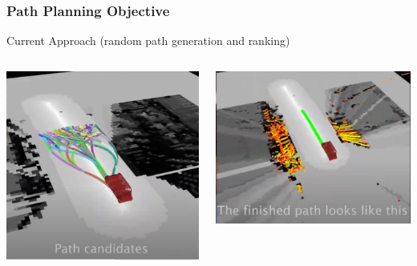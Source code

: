 \documentclass[aspectratio=169]{beamer}
\begin{document}
\begin{frame}
	\frametitle{Path Planning Objective \cite{nova}}
	Current Approach (random path generation and ranking)
	\begin{columns}
		\begin{column}{0.4\textwidth}
			\includegraphics[width = \columnwidth]{figs/NOVA-demo2_pathCanidates.png}
		\end{column}
		\begin{column}{0.4\textwidth}
			\includegraphics[width = \columnwidth]{figs/NOVA-demo2_pathSolution.png}
		\end{column}
	\end{columns}

\end{frame}
\end{document}
